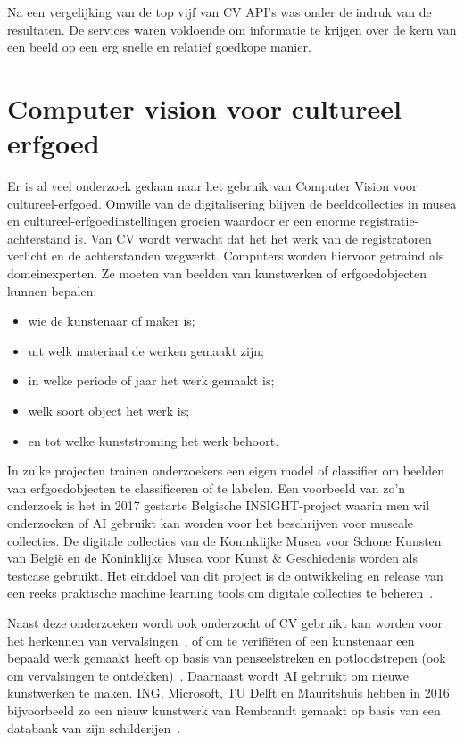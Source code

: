 Na een vergelijking van de top vijf van CV API’s was \textcite{Oberoi2016} onder de indruk van de resultaten. De services waren voldoende om informatie te krijgen over de kern van een beeld op een erg snelle en relatief goedkope manier.

\section{Computer vision voor cultureel erfgoed}
\label{sec:cv-voor-ce}

Er is al veel onderzoek gedaan naar het gebruik van Computer Vision voor cultureel-erfgoed. Omwille van de digitalisering blijven de beeldcollecties in musea en cultureel-erfgoedinstellingen groeien waardoor er een enorme registratie-achterstand is. Van CV wordt verwacht dat het het werk van de registratoren verlicht en de achterstanden wegwerkt. Computers worden hiervoor getraind als domeinexperten. Ze moeten van beelden van kunstwerken of erfgoedobjecten kunnen bepalen:
\begin{itemize}
	\item wie de kunstenaar of maker is;
	\item uit welk materiaal de werken gemaakt zijn; 
	\item in welke periode of jaar het werk gemaakt is;
	\item welk soort object het werk is;
	\item en tot welke kunststroming het werk behoort.  
\end{itemize}


In zulke projecten trainen onderzoekers een eigen model of classifier om beelden van erfgoedobjecten te classificeren of te labelen. Een voorbeeld van zo’n onderzoek is het in 2017 gestarte Belgische INSIGHT-project waarin men wil onderzoeken of AI gebruikt kan worden voor het beschrijven voor museale collecties. De digitale collecties van de Koninklijke Musea voor Schone Kunsten van Belgi\"{e} en de Koninklijke Musea voor Kunst \& Geschiedenis worden als testcase gebruikt. Het einddoel van dit project is de ontwikkeling en release van een reeks praktische machine learning tools om digitale collecties te beheren~\autocite{UniAntwerpen2017?}.

Naast deze onderzoeken wordt ook onderzocht of CV gebruikt kan worden voor het herkennen van vervalsingen~\autocite{Dickson2018}, of om te verifi\"{e}ren of een kunstenaar een bepaald werk gemaakt heeft op basis van penseelstreken en potloodstrepen (ook om vervalsingen te ontdekken)~\autocite{Elgammal2017}. Daarnaast wordt AI gebruikt om nieuwe kunstwerken te maken\autocite{Dickson2019}. ING, Microsoft, TU Delft en Mauritshuis hebben in 2016 bijvoorbeeld zo een nieuw kunstwerk van Rembrandt gemaakt op basis van een databank van zijn schilderijen~\autocite{ING2016}.

